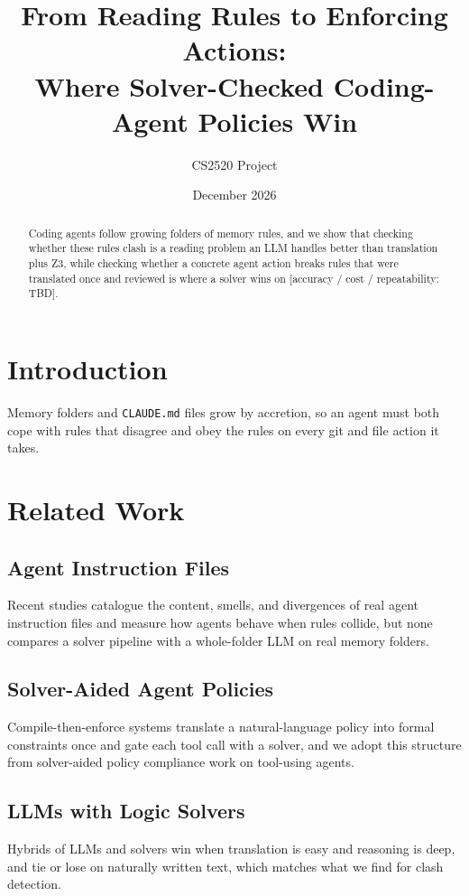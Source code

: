 \documentclass[11pt]{article}
\title{From Reading Rules to Enforcing Actions:\\Where Solver-Checked Coding-Agent Policies Win}
\author{CS2520 Project}
\date{December 2026}
\begin{document}
\maketitle


\begin{abstract}
Coding agents follow growing folders of memory rules, and we show that checking whether these
rules clash is a reading problem an LLM handles better than translation plus Z3, while
checking whether a concrete agent action breaks rules that were translated once and reviewed
is where a solver wins on [accuracy / cost / repeatability: TBD].
\end{abstract}

\section{Introduction}
Memory folders and \texttt{CLAUDE.md} files grow by accretion, so an agent must both cope with
rules that disagree and obey the rules on every git and file action it takes.

\section{Related Work}
\subsection{Agent Instruction Files}
Recent studies catalogue the content, smells, and divergences of real agent instruction files
and measure how agents behave when rules collide, but none compares a solver pipeline with a
whole-folder LLM on real memory folders.
\subsection{Solver-Aided Agent Policies}
Compile-then-enforce systems translate a natural-language policy into formal constraints
once and gate each tool call with a solver, and we adopt this structure from solver-aided
policy compliance work on tool-using agents.
\subsection{LLMs with Logic Solvers}
Hybrids of LLMs and solvers win when translation is easy and reasoning is deep, and tie or
lose on naturally written text, which matches what we find for clash detection.
\end{document}
